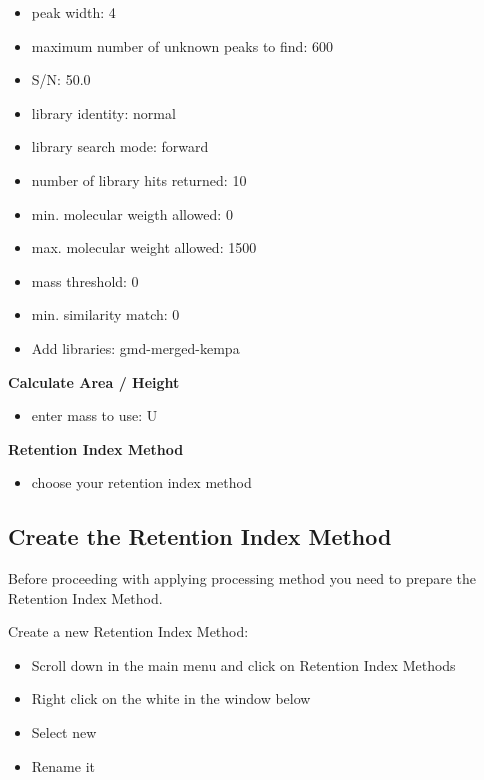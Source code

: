 \documentclass[]{book}
\providecommand{\tightlist}{%
  \setlength{\itemsep}{0pt}\setlength{\parskip}{0pt}}
\begin{document}
\begin{itemize}
\tightlist
\item
  peak width: 4
\item
  maximum number of unknown peaks to find: 600
\item
  S/N: 50.0
\item
  library identity: normal
\item
  library search mode: forward
\item
  number of library hits returned: 10
\item
  min. molecular weigth allowed: 0
\item
  max. molecular weight allowed: 1500
\item
  mass threshold: 0
\item
  min. similarity match: 0
\item
  Add libraries: gmd-merged-kempa
\end{itemize}

\textbf{Calculate Area / Height}

\begin{itemize}
\tightlist
\item
  enter mass to use: U
\end{itemize}

\textbf{Retention Index Method}

\begin{itemize}
\tightlist
\item
  choose your retention index method
\end{itemize}

\hypertarget{createri}{%
\subsection{Create the Retention Index Method}\label{createri}}

Before proceeding with applying processing method you need to prepare the Retention Index Method.

Create a new Retention Index Method:

\begin{itemize}
\tightlist
\item
  Scroll down in the main menu and click on Retention Index Methods
\item
  Right click on the white in the window below
\item
  Select new
\item
  Rename it
\end{itemize}
\end{document}
